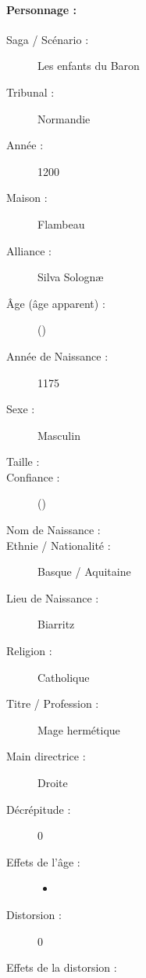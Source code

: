 \pagestyle{fancy}
\thispagestyle{plain}
{\Large \paragraph*{\Large Personnage :} \magusname}
\begin{multicols}{2}
\begin{description}
\item[Saga / Scénario :] Les enfants du Baron
\item[Tribunal :] Normandie
\item[Année :] 1200
\item[Maison :] Flambeau
\item[Alliance :] Silva Solognæ
\item[Âge (âge apparent) :] \magusage{} (\magusapparentage)
\item[Année de Naissance :] 1175
\item[Sexe :] Masculin
\item[Taille :] \magussize
\item[Confiance :] \magusconfidencescore{} (\magusconfidencepts)
\columnbreak
\item[Nom de Naissance :] \magusbirthname
\item[Ethnie /  Nationalité :] Basque / Aquitaine
\item[Lieu de Naissance :] Biarritz
\item[Religion :] Catholique
\item[Titre / Profession :] Mage hermétique
\item[Main directrice :] Droite
\vspace{-1em}
\end{description}
\end{multicols}
\begin{multicols}{2}
\begin{description}
\item[Décrépitude :] 0
\item[Effets de l'âge :]\hspace{0pt}
\begin{itemize}
\item
\end{itemize}
\columnbreak
\item[Distorsion :] 0
\item[Effets de la distorsion :]\hspace{0pt}
\magusscarslong
\end{description}
\end{multicols}
